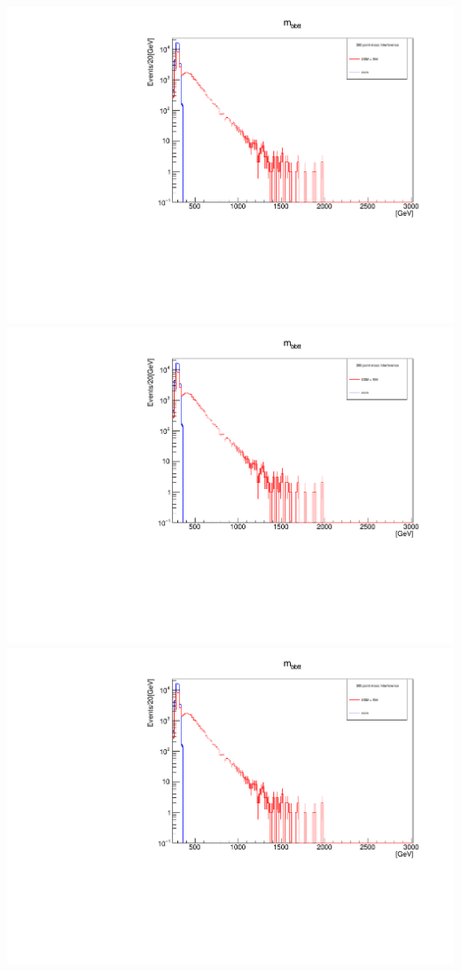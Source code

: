 \documentclass[a4wide,10pt]{article}
\begin{document}
\includegraphics[scale=0.50,page=1]{InterferencePlots.pdf}
\includegraphics[scale=0.50,page=2]{InterferencePlots.pdf}
\includegraphics[scale=0.50,page=3]{InterferencePlots.pdf}
\end{document}
